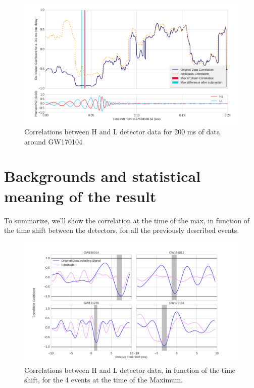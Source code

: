 \documentclass[a4paper,11pt]{article}
\begin{document}
\begin{figure}[]
  \centering
    \includegraphics[width=\columnwidth]{GW170104CorrVsTime.png}
\caption{Correlations between H and L detector data for 200 ms of data around GW170104}
\label{fig:170104corr}
\end{figure}

\section{Backgrounds and statistical meaning of the result}

To summarize, we'll show the correlation at the time of the max, in function of the time shift between the detectors, for all the previously described events.

\begin{figure}[]
  \centering
    \includegraphics[width=\columnwidth]{AllMaxCorrVsTimeShift.png}
\caption{Correlations between H and L detector data, in function of the time shift, for the 4 events at the time of the Maximum.}
\label{fig:CorrVsTimeShift}
\end{figure}
\end{document}
